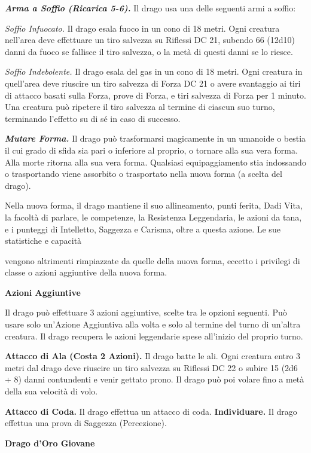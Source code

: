 \begin{multicols}{2}
\emph{\textbf{Arma a Soffio (Ricarica 5-6).}} Il drago usa una delle
seguenti armi a soffio:

\emph{Soffio Infuocato.} Il drago esala fuoco in un cono di 18 metri.
Ogni creatura nell'area deve effettuare un tiro salvezza su Riflessi DC
21, subendo 66 (12d10) danni da fuoco se fallisce il tiro salvezza, o la
metà di questi danni se lo riesce.

\emph{Soffio Indebolente.} Il drago esala del gas in un cono di 18
metri. Ogni creatura in quell'area deve riuscire un tiro salvezza di Forza DC 21 o avere svantaggio ai tiri di attacco basati sulla Forza,
prove di Forza, e tiri salvezza di Forza per 1 minuto. Una creatura può
ripetere il tiro salvezza al termine di ciascun suo turno, terminando
l'effetto su di sé in caso di successo.

\emph{\textbf{Mutare Forma.}} Il drago può trasformarsi magicamente in
un umanoide o bestia il cui grado di sfida sia pari o inferiore al
proprio, o tornare alla sua vera forma. Alla morte ritorna alla sua vera
forma. Qualsiasi equipaggiamento stia indossando o trasportando viene
assorbito o trasportato nella nuova forma (a scelta del drago).

Nella nuova forma, il drago mantiene il suo allineamento, punti ferita,
Dadi Vita, la facoltà di parlare, le competenze, la Resistenza
Leggendaria, le azioni da tana, e i punteggi di Intelletto, Saggezza e
Carisma, oltre a questa azione. Le sue statistiche e capacità

vengono altrimenti rimpiazzate da quelle della nuova forma, eccetto i
privilegi di classe o azioni aggiuntive della nuova forma.

\textbf{Azioni Aggiuntive}

Il drago può effettuare 3 azioni aggiuntive, scelte tra le opzioni
seguenti. Può usare solo un'Azione Aggiuntiva alla volta e solo al
termine del turno di un'altra creatura. Il drago recupera le azioni
leggendarie spese all'inizio del proprio turno.

\textbf{Attacco di Ala (Costa 2 Azioni).} Il drago batte le ali. Ogni
creatura entro 3 metri dal drago deve riuscire un tiro salvezza su Riflessi DC 22 o subire 15 (2d6 + 8) danni contundenti e venir gettato
prono. Il drago può poi volare fino a metà della sua velocità di volo.

\textbf{Attacco di Coda.} Il drago effettua un attacco di coda.
\textbf{Individuare.} Il drago effettua una prova di Saggezza
(Percezione).

\textbf{Drago d'Oro Giovane}


\end{multicols}
